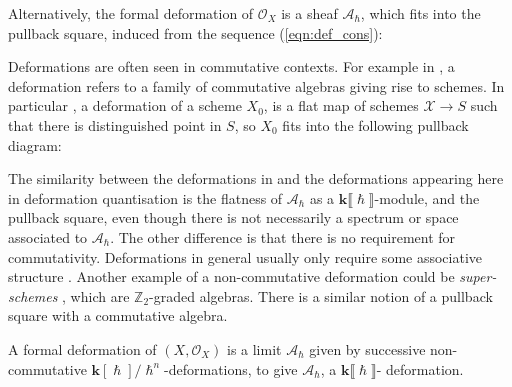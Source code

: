    Alternatively, the formal deformation of \(\mathcal{O}_X\) is a sheaf \( \mathcal{A}_{\hslash}\), which fits into the pullback square, induced from the sequence (\ref{eqn:def_cons}):
    \begin{center}
    \end{center}
    \begin{rem} 
    Deformations are often seen in commutative contexts. For example in \cite{hartshorne_def}, a deformation refers to a family of commutative algebras giving rise to schemes. In particular \cite{hartshorne_def}, a deformation of a scheme \(X_0\), is a flat map of schemes \(\mathcal{X} \rightarrow S\) such that there is distinguished point in \(S\), so \(X_0\) fits into the following pullback diagram:
    \begin{center}
    \end{center}
    The similarity between the deformations in \cite{hartshorne_def} and the deformations appearing here in deformation quantisation is the flatness of \( \mathcal{A}_{\hslash} \) as a \( \mathbf{k}\lBrack \hslash \rBrack\)-module, and the pullback square, even though there is not necessarily a spectrum or space associated to \( \mathcal{A}_{\hslash}\). The other difference is that there is no requirement for commutativity. Deformations in general usually only require some associative structure \cite{k_def_book}. Another example of a non-commutative deformation could be \emph{super-schemes} \cite{super}, which are \(\mathbb{Z}_2\)-graded algebras. There is a similar notion of a pullback square with a commutative algebra.
    \end{rem} 
    
    A formal deformation of \( (X,\mathcal{O}_X)\) is a limit \(\mathcal{A}_{\hslash}\) given by successive non-commutative \( \mathbf{k}[\hslash]/\hslash^n\)-deformations, to give \( \mathcal{A}_{\hslash}\), a \( \mathbf{k} \lBrack \hslash \rBrack \)- deformation. 
    \begin{center} 
    \end{center} 
    
